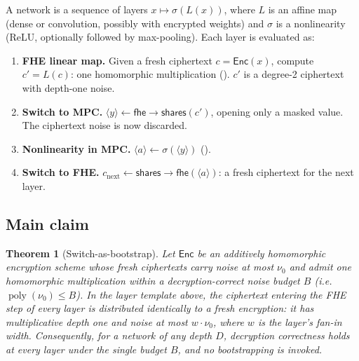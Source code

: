 \documentclass[11pt]{article}
\theoremstyle{plain}
\newtheorem{theorem}{Theorem}
\theoremstyle{definition}
\theoremstyle{remark}
\newcommand{\Enc}{\mathsf{Enc}}
\newcommand{\toMPC}{\mathsf{fhe{\to}shares}}
\newcommand{\toFHE}{\mathsf{shares{\to}fhe}}
\DeclareMathOperator{\poly}{poly}
\begin{document}
A network is a sequence of layers $x \mapsto \sigma(L(x))$, where $L$ is an
affine map (dense or convolution, possibly with encrypted weights) and
$\sigma$ is a nonlinearity (ReLU, optionally followed by max-pooling). Each
layer is evaluated as:
\begin{enumerate}
\item \textbf{FHE linear map.} Given a fresh ciphertext $c=\Enc(x)$, compute
$c' = L(c)$: one homomorphic multiplication (). $c'$ is a
degree-2 ciphertext with depth-one noise.
\item \textbf{Switch to MPC.} $\langle y\rangle \leftarrow \toMPC(c')$,
opening only a masked value. The ciphertext noise is now discarded.
\item \textbf{Nonlinearity in MPC.}
$\langle a\rangle \leftarrow \sigma(\langle y\rangle)$ ().
\item \textbf{Switch to FHE.} $c_{\mathrm{next}} \leftarrow \toFHE(\langle
a\rangle)$: a fresh ciphertext for the next layer.
\end{enumerate}

\subsection{Main claim}

\begin{theorem}[Switch-as-bootstrap]\label{thm:main}
Let $\Enc$ be an additively homomorphic encryption scheme whose fresh
ciphertexts carry noise at most $\nu_0$ and admit one homomorphic
multiplication within a decryption-correct noise budget $B$ (i.e.
$\poly(\nu_0)\le B$). In the layer template above, the ciphertext entering
the FHE step of \emph{every} layer is distributed identically to a fresh
encryption: it has multiplicative depth one and noise at most $w\cdot\nu_0$,
where $w$ is the layer's fan-in width. Consequently, for a network of any
depth $D$, decryption correctness holds at every layer under the single
budget $B$, and no bootstrapping is invoked.
\end{theorem}
\end{document}
